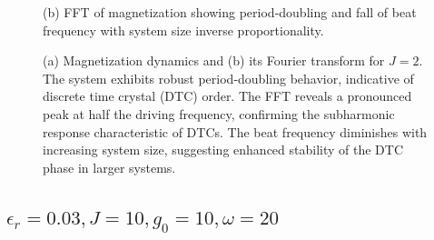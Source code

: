 \documentclass[a4paper, 11pt]{article}
\begin{document}
\begin{figure}[h!]
\begin{minipage}[t]{0.48\textwidth}
        \caption*{(b) FFT of magnetization showing period-doubling and fall of beat frequency with system size inverse proportionality.}
    \end{minipage}
    \caption{(a) Magnetization dynamics and (b) its Fourier transform for $J = 2$. The system exhibits robust period-doubling behavior, indicative of discrete time crystal (DTC) order. The FFT reveals a pronounced peak at half the driving frequency, confirming the    subharmonic response characteristic of DTCs. The beat frequency diminishes with increasing system size, suggesting enhanced stability of the DTC phase in larger systems.}  

\end{figure}

\newpage
\subsection{$\epsilon_r = 0.03, J = 10, g_0 = 10, \omega = 20$}
\end{document}
